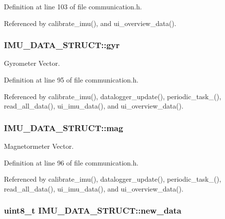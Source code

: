 Definition at line 103 of file communication.\-h.



Referenced by calibrate\-\_\-imu(), and ui\-\_\-overview\-\_\-data().

\hypertarget{structIMU__DATA__STRUCT_a0c1ac26626e4434a2ee124a1928a23a1}{
\subsubsection[{gyr}]{ I\-M\-U\-\_\-\-D\-A\-T\-A\-\_\-\-S\-T\-R\-U\-C\-T\-::gyr}}\label{structIMU__DATA__STRUCT_a0c1ac26626e4434a2ee124a1928a23a1}


Gyrometer Vector. 



Definition at line 95 of file communication.\-h.



Referenced by calibrate\-\_\-imu(), datalogger\-\_\-update(), periodic\-\_\-task\-\_(), read\-\_\-all\-\_\-data(), ui\-\_\-imu\-\_\-data(), and ui\-\_\-overview\-\_\-data().

\hypertarget{structIMU__DATA__STRUCT_a40c7df8b6d49297aa52873cfd9b60daa}{
\subsubsection[{mag}]{ I\-M\-U\-\_\-\-D\-A\-T\-A\-\_\-\-S\-T\-R\-U\-C\-T\-::mag}}\label{structIMU__DATA__STRUCT_a40c7df8b6d49297aa52873cfd9b60daa}


Magnetormeter Vector. 



Definition at line 96 of file communication.\-h.



Referenced by calibrate\-\_\-imu(), datalogger\-\_\-update(), periodic\-\_\-task\-\_(), read\-\_\-all\-\_\-data(), ui\-\_\-imu\-\_\-data(), and ui\-\_\-overview\-\_\-data().

\hypertarget{structIMU__DATA__STRUCT_a99924252176326418863e511d4fa437b}{
\subsubsection[{new\-\_\-data}]{\setlength{\rightskip}{0pt plus 5cm}uint8\-\_\-t I\-M\-U\-\_\-\-D\-A\-T\-A\-\_\-\-S\-T\-R\-U\-C\-T\-::new\-\_\-data}}\label{structIMU__DATA__STRUCT_a99924252176326418863e511d4fa437b}



